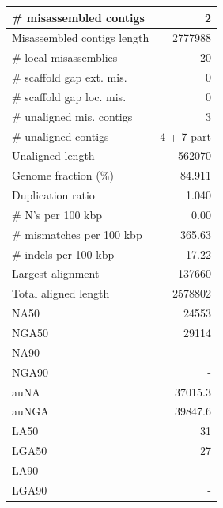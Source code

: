 \documentclass[12pt,a4paper]{article}
\begin{document}
\begin{table}[ht]
\begin{center}
\begin{tabular}{|l*{1}{|r}|}
\# misassembled contigs & 2 \\ \hline
Misassembled contigs length & 2777988 \\ \hline
\# local misassemblies & 20 \\ \hline
\# scaffold gap ext. mis. & 0 \\ \hline
\# scaffold gap loc. mis. & 0 \\ \hline
\# unaligned mis. contigs & 3 \\ \hline
\# unaligned contigs & 4 + 7 part \\ \hline
Unaligned length & 562070 \\ \hline
Genome fraction (\%) & 84.911 \\ \hline
Duplication ratio & 1.040 \\ \hline
\# N's per 100 kbp & 0.00 \\ \hline
\# mismatches per 100 kbp & 365.63 \\ \hline
\# indels per 100 kbp & 17.22 \\ \hline
Largest alignment & 137660 \\ \hline
Total aligned length & 2578802 \\ \hline
NA50 & 24553 \\ \hline
NGA50 & 29114 \\ \hline
NA90 & - \\ \hline
NGA90 & - \\ \hline
auNA & 37015.3 \\ \hline
auNGA & 39847.6 \\ \hline
LA50 & 31 \\ \hline
LGA50 & 27 \\ \hline
LA90 & - \\ \hline
LGA90 & - \\ \hline
\end{tabular}
\end{center}
\end{table}
\end{document}
